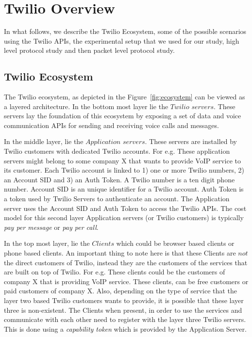 \section{Twilio Overview}
\label{sec-twilioecoandprotocolstudy}
In what follows, we describe the Twilio Ecosystem, some of the possible scenarios using the Twilio APIs, the experimental setup that we used for our study, high level protocol study and then packet level protocol study.
\subsection{Twilio Ecosystem}
\label{subsec-twilioeco}
The Twilio ecosystem, as depicted in the Figure~\ref{fig:ecosystem} can be viewed as a layered architecture. In the bottom most layer lie the $Twilio$  $servers$. These servers lay the foundation of this ecosystem by exposing a set of data and voice communication APIs for sending and receiving voice calls and messages. 

In the middle layer, lie the $Application$ $servers$. These servers are installed by Twilio customers with dedicated Twilio accounts. For e.g. These application servers might belong to some company X that wants to provide VoIP service to its customer. Each Twilio account is linked to 1) one or more Twilio numbers, 2) an Account SID and 3) an Auth Token. A Twilio number is a ten digit phone number. Account SID is an unique identifier for a Twilio account. Auth Token is a token used by Twilio Servers to authenticate an account. The Application server uses the Account SID and Auth Token to access the Twilio APIs. The cost model for this second layer Application servers (or Twilio customers) is typically \textit{pay per message} or \textit{pay per call}. 

In the top most layer, lie the $Clients$ which could be browser based clients or phone based clients. An important thing to note here is that these Clients are $not$ the direct customers of Twilio, instead they are the customers of the services that are built on top of Twilio. For e.g. These clients could be the customers of company X that is providing VoIP service. These clients, can be free customers or paid customers of company X. Also, depending on the type of service that the layer two based Twilio customers wants to provide, it is possible that these layer three is non-existent.  The Clients when present, in order to use the services and communicate with each other need to register with the layer three Twilio servers. This is done using a \textit{capability token} which is provided by the Application Server. 

